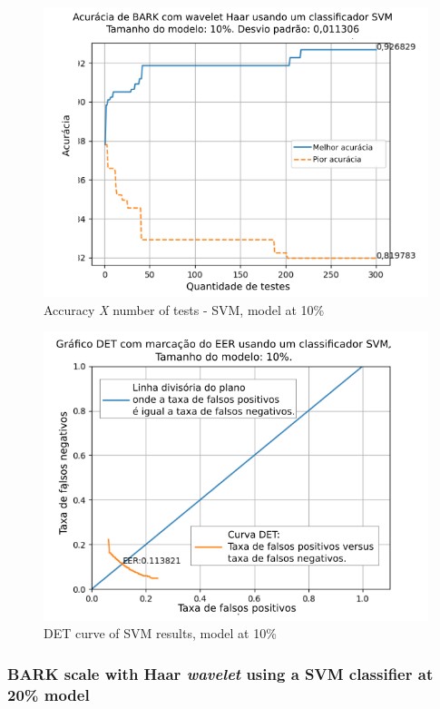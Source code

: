 			
			
			\begin{figure}[H]
				\centering
				\includegraphics[width=.8\linewidth]{images/results/confusionMatrices/classifier_SVM_10.png}
				\caption{Accuracy \textit{X} number of tests - SVM, model at 10\%}
				\label{fig:classifiersvm10}
			\end{figure}
			
			\begin{figure}[H]
				\centering
				\includegraphics[width=.9\linewidth]{images/results/det/DET_SVM_10}
				\caption{DET curve of SVM results, model at 10\%}
				\label{fig:detsvm10}
			\end{figure}
		
		\subsubsection{BARK scale with Haar \textit{wavelet} using a SVM classifier at 20\% model}
			

